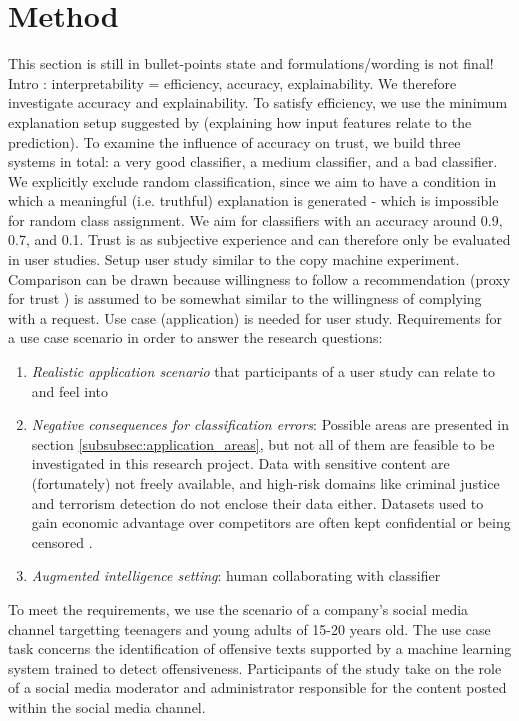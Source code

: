 \section{Method}
{\color{blue}This section is still in bullet-points state and formulations/wording is not final!}\medskip \newline
Intro\newline
\cite{ruping2006learning}: interpretability = efficiency, accuracy, explainability.
We therefore investigate accuracy and explainability. To satisfy efficiency, we use the minimum explanation setup suggested by \cite{goodman16eu} (explaining how input features relate to the prediction).\newline
To examine the influence of accuracy on trust, we build three systems in total: a very good classifier, a medium classifier, and a bad classifier. We explicitly exclude random classification, since we aim to have a condition in which a meaningful (i.e. truthful) explanation is generated - which is impossible for random class assignment. We aim for classifiers with an accuracy around 0.9, 0.7, and 0.1. \newline
Trust is as subjective experience and can therefore only be evaluated in user studies. Setup user study similar to the copy machine experiment. Comparison can be drawn because willingness to follow a recommendation (proxy for trust \cite{vorm2018assessing}) is assumed to be somewhat similar to the willingness of complying with a request. Use case (application) is needed for user study.\newline
Requirements for a use case scenario in order to answer the research questions:
\begin{enumerate}
	\item \textit{Realistic application scenario} that participants of a user study can relate to and feel into
	\item \textit{Negative consequences for classification errors}: Possible areas are presented in section \ref{subsubsec:application_areas}, but not all of them are feasible to be investigated in this research project. Data with sensitive content are (fortunately) not freely available, and high-risk domains like criminal justice and terrorism detection do not enclose their data either. Datasets used to gain economic advantage over competitors are often kept confidential or being censored \cite{diakopoulos2016accountability}.
	\item \textit{Augmented intelligence setting}: human collaborating with classifier
\end{enumerate}
To meet the requirements, we use the scenario of a company's social media channel targetting teenagers and young adults of 15-20 years old. The use case task concerns the identification of offensive texts supported by a machine learning system trained to detect offensiveness. Participants of the study take on the role of a social media moderator and administrator responsible for the content posted within the social media channel. 




